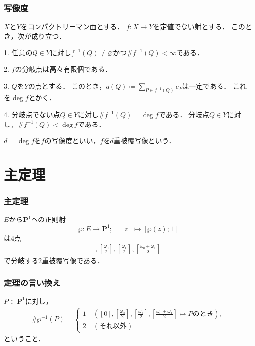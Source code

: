 \documentclass[dvipdfmx,12pt,aspectratio=169]{beamer}%
\newcommand{\pp}{\mathbf{P}}
\begin{document}
\begin{frame}
    \frametitle{写像度}
    \begin{fact}\label{fact:deg}
        $X$と$Y$をコンパクトリーマン面とする．
        $f\colon X\to Y$を定値でない射とする．
        このとき，次が成り立つ．
        
        1.
        任意の$Q\in Y$に対し$f^{-1}(Q)\neq\varnothing$かつ$\#f^{-1}(Q)<\infty$である．
        
        2. 
        $f$の分岐点は高々有限個である．
        
        3. 
        $Q$を$Y$の点とする．
        このとき，$d(Q)\coloneqq \sum_{P\in f^{-1}(Q)}e_P$は一定である．
        これを$\deg f$とかく．
        
        4. 
        分岐点でない点$Q\in Y$に対し$\# f^{-1}(Q)=\deg f$である．
        分岐点$Q\in Y$に対し，$\# f^{-1}(Q)<\deg f$である．
    \end{fact}

    \begin{definition}
        $d=\deg f$を$f$の写像度といい，$f$を$d$重被覆写像という．
    \end{definition}
\end{frame}

\section{主定理}
\begin{frame}\frametitle{主定理}
    \begin{Theorem}
        $E$から$\pp^1$への正則射
        \begin{equation*}
            \wp\colon E\to\pp^1;\quad [z]\mapsto [\wp(z);1]    
        \end{equation*}は$\mathrm{4}$点
        \begin{align*}
            [0],
            \left[\frac{\omega_0}{2}\right],
            \left[\frac{\omega_1}{2}\right],
            \left[\frac{\omega_0+\omega_1}{2}\right]
        \end{align*}
        で分岐する$\mathrm{2}$重被覆写像である．
    \end{Theorem}
\end{frame}

\begin{frame}\frametitle{定理の言い換え}
        $P\in \pp^1$に対し，    
    \begin{align*}
        \#\wp^{-1}(P)=
        \begin{cases}
            1\quad ([0],\left[\frac{\omega_0}{2}\right], 
            \left[\frac{\omega_1}{2}\right], 
            \left[\frac{\omega_0+\omega_1}{2}\right]\mapsto P\text{のとき}), \\    
            2\quad (\text{それ以外})
        \end{cases}
    \end{align*}
    ということ．
\end{frame}
\end{document}

